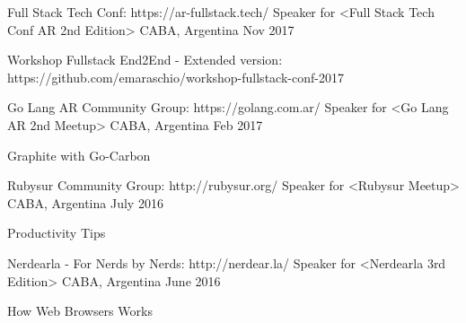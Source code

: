 
\begin{cventries}
  \cventry
    {Full Stack Tech Conf: https://ar-fullstack.tech/}
    {Speaker for <Full Stack Tech Conf AR 2nd Edition>}
    {CABA, Argentina}
    {Nov 2017}
    {
      \begin{cvitems}
        \item {Workshop Fullstack End2End - Extended version: https://github.com/emaraschio/workshop-fullstack-conf-2017}
      \end{cvitems}
    }



  \cventry
    {Go Lang AR Community Group: https://golang.com.ar/ }
    {Speaker for <Go Lang AR 2nd Meetup>}
    {CABA, Argentina}
    {Feb 2017}
    {
      \begin{cvitems}
        \item {Graphite with Go-Carbon}
      \end{cvitems}
    }

  \cventry
    {Rubysur Community Group: http://rubysur.org/}
    {Speaker for <Rubysur Meetup>}
    {CABA, Argentina}
    {July 2016}
    {
      \begin{cvitems}
        \item {Productivity Tips}
      \end{cvitems}
    }

  \cventry
    {Nerdearla - For Nerds by Nerds: http://nerdear.la/}
    {Speaker for <Nerdearla 3rd Edition>}
    {CABA, Argentina}
    {June 2016}
    {
      \begin{cvitems}
        \item {How Web Browsers Works}
      \end{cvitems}
    }


\end{cventries}
